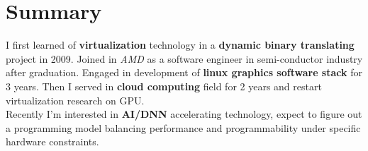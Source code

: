 \vspace{0.2cm}

\section{Summary}
\vspace{-0.2cm}
I first learned of \textbf{virtualization} technology in a
\textbf{dynamic binary translating} project in 2009. Joined in
\textit{AMD} as a software engineer in semi-conductor industry after
graduation. Engaged in development of \textbf{linux graphics software stack} for
3 years. Then I served in \textbf{cloud computing} field for 2 years and restart
virtualization research on GPU.\\
Recently I'm interested in \textbf{AI/DNN} accelerating technology, expect to figure
out a programming model balancing performance and programmability under specific
hardware constraints.
